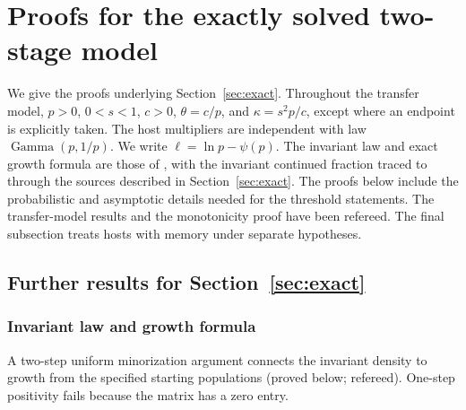 \section{Proofs for the exactly solved two-stage model}\label{sec:exact-app}

We give the proofs underlying Section~\ref{sec:exact}. Throughout the transfer model, $p>0$, $0<s<1$, $c>0$, $\theta=c/p$, and $\kappa=s^2p/c$, except where an endpoint is explicitly taken. The host multipliers are independent with law $\operatorname{Gamma}(p,1/p)$. We write $\ell=\ln p-\psi(p)$. The invariant law and exact growth formula are those of \citet{roerdink1988}, with the invariant continued fraction traced to \citet{dyson1953} through the sources described in Section~\ref{sec:exact}. The proofs below include the probabilistic and asymptotic details needed for the threshold statements. The transfer-model results and the monotonicity proof have been refereed. The final subsection treats hosts with memory under separate hypotheses.

\subsection{Further results for Section~\ref{sec:exact}}

\subsubsection{Invariant law and growth formula}

A two-step uniform minorization argument connects the invariant density to growth from the specified starting populations (proved below; refereed). One-step positivity fails because the matrix has a zero entry.

